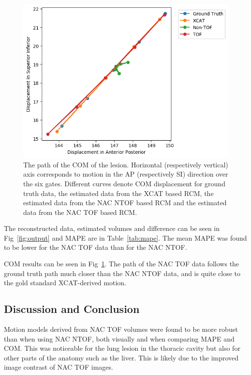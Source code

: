             \begin{figure}
                \centering
                
                \includegraphics[width=1.0\linewidth]{figures/TOF.png}
                
                \captionsetup{singlelinecheck=false, justification=raggedright}
                \caption{The path of the \gls{COM} of the lesion. Horizontal (respectively vertical) axis corresponds to motion in the \gls{AP} (respectively \gls{SI}) direction over the six gates. Different curves denote \gls{COM} displacement for  ground truth data, the estimated data from the \gls{XCAT} based \gls{RCM}, the estimated data from the \gls{NAC} \gls{NTOF} based \gls{RCM} and the estimated data from the \gls{NAC} \gls{TOF} based \gls{RCM}.} \label{fig:com_graph}
            \end{figure}
            
             The reconstructed data, estimated volumes and difference can be seen in Fig~\ref{fig:output} and \gls{MAPE} are in Table~\ref{tab:mape}. The mean \gls{MAPE} was found to be lower for the \gls{NAC} \gls{TOF} data than for the \gls{NAC} \gls{NTOF}.
            
             \gls{COM} results can be seen in Fig~\ref{fig:com_graph}. The path of the \gls{NAC} \gls{TOF} data follows the ground truth path much closer than the \gls{NAC} \gls{NTOF} data, and is quite close to the gold standard \gls{XCAT}-derived motion.
            
        \subsection{Discussion and Conclusion} \label{impact_of_tof_on_respiratory_motion_modelling_using_nac_pet_discussion_and_conclusion}
            Motion models derived from \gls{NAC} \gls{TOF} volumes were found to be more robust than when using \gls{NAC} \gls{NTOF}, both visually and when comparing \gls{MAPE} and \gls{COM}. This was noticeable for the lung lesion in the thoracic cavity but also for other parts of the anatomy such as the liver. This is likely due to the improved image contrast of \gls{NAC} \gls{TOF} images.


